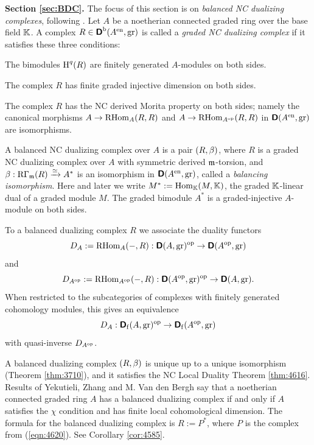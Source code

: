 \medskip \noindent 
{\bf Section \ref{sec:BDC}.}
The focus of this section is on {\em balanced NC dualizing complexes}, 
following \cite{Ye1}.
Let $A$ be a noetherian connected graded ring over the base field $\mathbb{K}$. A 
complex $R \in \boldsymbol{\mathsf{D}}^{\mathrm{b}}(A^{\mathrm{en}}, \mathrm{gr})$
is called a {\em graded NC dualizing complex} if it satisfies these three 
conditions:
\begin{enumerate}
 The bimodules $\operatorname{H}^q(R)$ are finitely generated 
$A$-modules on both sides.

 The complex $R$ has finite graded injective 
dimension on both sides.

 The complex $R$ has the NC derived Morita property on both 
sides; namely the canonical morphisms 
$A \to \operatorname{RHom}_{A}(R, R)$ and 
$A \to \operatorname{RHom}_{A^{\mathrm{op}}}(R, R)$ 
in $\boldsymbol{\mathsf{D}}(A^{\mathrm{en}}, \mathrm{gr})$ are isomorphisms. 
\end{enumerate}

A balanced NC dualizing complex over $A$ is a pair $(R, \beta)$,
where $R$ is a graded NC dualizing complex over $A$ with symmetric derived 
$\mathfrak{m}$-torsion, and 
$\beta : \mathrm{R} \Gamma_{\mathfrak{m}}(R) \xrightarrow{\simeq} A^*$
is an isomorphism in $\boldsymbol{\mathsf{D}}(A^{\mathrm{en}}, \mathrm{gr})$, called a {\em 
balancing isomorphism}. Here and later we write 
$M^* := \operatorname{Hom}_{\mathbb{K}}(M, \mathbb{K})$, the graded $\mathbb{K}$-linear dual of a graded module 
$M$. The graded bimodule $A^*$ is a graded-injective $A$-module on both sides. 

To a balanced dualizing complex $R$ we associate the duality functors 
\[ D_A := \operatorname{RHom}_{A}(-, R) : \boldsymbol{\mathsf{D}}(A, \mathrm{gr})^{\mathrm{op}}
\to \boldsymbol{\mathsf{D}}(A^{\mathrm{op}}, \mathrm{gr}) \]
and 
\[ D_{A^{\mathrm{op}}} := \operatorname{RHom}_{A^{\mathrm{op}}}(-, R) : 
\boldsymbol{\mathsf{D}}(A^{\mathrm{op}}, \mathrm{gr})^{\mathrm{op}}
\to \boldsymbol{\mathsf{D}}(A, \mathrm{gr}) . \]
When restricted to the subcategories of complexes with finitely generated 
cohomology modules, this gives an equivalence 
\begin{equation} \label{eqn:5018}
D_A :  \boldsymbol{\mathsf{D}}_{\mathrm{f}}(A, \mathrm{gr})^{\mathrm{op}}
\to \boldsymbol{\mathsf{D}}_{\mathrm{f}}(A^{\mathrm{op}}, \mathrm{gr})
\end{equation}
with quasi-inverse $D_{A^{\mathrm{op}}}$. 

A balanced dualizing complex $(R, \beta)$ is unique up to a unique isomorphism 
(Theorem \ref{thm:3710}), and it satisfies the NC Local Duality Theorem 
\ref{thm:4616}.  Results of Yekutieli, Zhang and M. Van den Bergh say that 
a noetherian connected graded ring $A$ has a balanced dualizing complex if and 
only if $A$ satisfies the $\chi$ condition and has finite local cohomological 
dimension. The formula for the balanced dualizing complex is 
$R := P^*$, where $P$ is the complex from (\ref{eqn:4620}). 
See Corollary \ref{cor:4585}.

